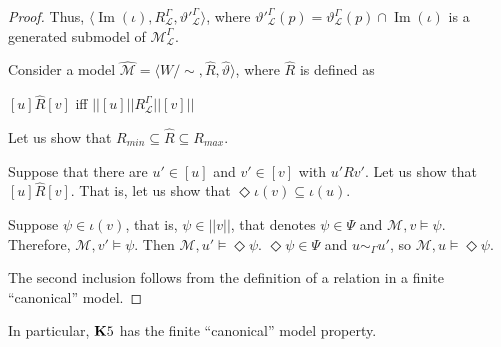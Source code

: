 \documentclass[a4paper]{article}
\theoremstyle{defin}
\theoremstyle{theorem}
\theoremstyle{prop}
\theoremstyle{lemma}
\theoremstyle{fact}
\theoremstyle{ex}
\theoremstyle{col}
\begin{document}
\begin{proof}
    Thus, $\langle \operatorname{Im}(\iota), R_{\mathcal{L}}^{\Gamma}, {\vartheta'}_{\mathcal{L}}^{\Gamma} \rangle$, where ${\vartheta'}_{\mathcal{L}}^{\Gamma}(p) = \vartheta_{\mathcal{L}}^{\Gamma}(p) \cap \operatorname{Im}(\iota)$
    is a generated submodel of $\mathcal{M}_{\mathcal{L}}^{\Gamma}$.

    Consider a model $\widehat{\mathcal{M}} = \langle W/\sim, \widehat{R}, \widehat{\vartheta} \rangle$, where $\widehat{R}$ is defined as
    \begin{center}
      $[u] \widehat{R} [v]$ iff $||[u]|| {R}_{\mathcal{L}}^{\Gamma} ||[v]||$
    \end{center}

    Let us show that $R_{min} \subseteq \widehat{R} \subseteq R_{max}$.

    Suppose that there are $u' \in [u]$ and $v' \in [v]$ with $u' R v'$. Let us show that
    $[u] \widehat{R} [v]$. That is, let us show that $\Diamond \iota(v) \subseteq \iota(u)$.

    Suppose $\psi \in \iota(v)$, that is, $\psi \in ||v||$, that denotes $\psi \in \Psi$ and $\mathcal{M}, v \models \psi$. Therefore, $\mathcal{M}, v' \models \psi$. Then $\mathcal{M}, u' \models \Diamond \psi$. $\Diamond \psi \in \Psi$ and $u \sim_{\Gamma} u'$, so
    $\mathcal{M}, u \models \Diamond \psi$.

    The second inclusion follows from the definition of a relation in a finite ``canonical'' model.
\end{proof}

In particular, ${\bf K}5$ has the finite ``canonical'' model property.



\end{document}

